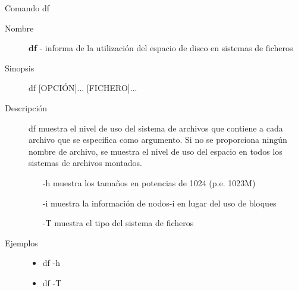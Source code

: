 \begin{frame}[c]{Comando df}
  \begin{description}
    \item[Nombre]
      \textbf{df} - informa de la utilización del espacio de disco en
      sistemas de ficheros

    \vspace{\baselineskip}
    \item[Sinopsis]
      df [OPCIÓN]... [FICHERO]...

    \vspace{\baselineskip}
    \item[Descripción]
      df muestra el nivel de uso del sistema de archivos que contiene a cada
      archivo que se especifica como argumento. Si no se proporciona ningún
      nombre de archivo, se muestra el nivel de uso del espacio en todos los
      sistemas de archivos montados.

      \begin{itemize}
        \item [-h] muestra los tamaños en potencias de 1024 (p.e. 1023M)
        \item [-i] muestra la información de nodos-i en lugar del uso de
          bloques
        \item [-T] muestra el tipo del sistema de ficheros
      \end{itemize}

    \vspace{\baselineskip}
    \item[Ejemplos]
      \begin{itemize}
        \item df -h
        \item df -T
      \end{itemize}
  \end{description}
\end{frame}

